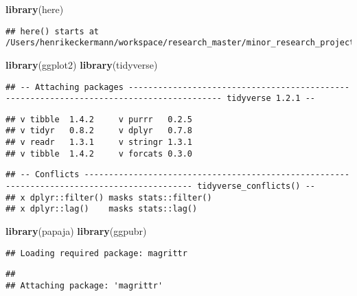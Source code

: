 \documentclass[]{article}
\title{}
\author{}
\date{}
\newenvironment{Shaded}{\begin{snugshade}}{\end{snugshade}}
\newcommand{\KeywordTok}[1]{\textcolor[rgb]{0.13,0.29,0.53}{\textbf{#1}}}
\newcommand{\NormalTok}[1]{#1}
\begin{document}
\begin{Shaded}
\begin{Highlighting}[]
\KeywordTok{library}\NormalTok{(here)}
\end{Highlighting}
\end{Shaded}

\begin{verbatim}
## here() starts at /Users/henrikeckermann/workspace/research_master/minor_research_project/article/analyses/bibo
\end{verbatim}

\begin{Shaded}
\begin{Highlighting}[]
\KeywordTok{library}\NormalTok{(ggplot2)}
\KeywordTok{library}\NormalTok{(tidyverse)}
\end{Highlighting}
\end{Shaded}

\begin{verbatim}
## -- Attaching packages ----------------------------------------------------------------------------------------- tidyverse 1.2.1 --
\end{verbatim}

\begin{verbatim}
## v tibble  1.4.2     v purrr   0.2.5
## v tidyr   0.8.2     v dplyr   0.7.8
## v readr   1.3.1     v stringr 1.3.1
## v tibble  1.4.2     v forcats 0.3.0
\end{verbatim}

\begin{verbatim}
## -- Conflicts -------------------------------------------------------------------------------------------- tidyverse_conflicts() --
## x dplyr::filter() masks stats::filter()
## x dplyr::lag()    masks stats::lag()
\end{verbatim}

\begin{Shaded}
\begin{Highlighting}[]
\KeywordTok{library}\NormalTok{(papaja)}
\KeywordTok{library}\NormalTok{(ggpubr)}
\end{Highlighting}
\end{Shaded}

\begin{verbatim}
## Loading required package: magrittr
\end{verbatim}

\begin{verbatim}
## 
## Attaching package: 'magrittr'
\end{verbatim}
\end{document}
